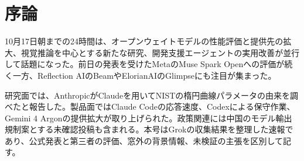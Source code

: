 \section*{序論}
10月17日朝までの24時間は、オープンウェイトモデルの性能評価と提供先の拡大、視覚推論を中心とする新たな研究、開発支援エージェントの実用改善が並行して話題になった。前日の発表を受けたMetaのMuse Spark Openへの評価が続く一方、Reflection AIのBeamやElorianAIのGlimpseにも注目が集まった。

研究面では、AnthropicがClaudeを用いてNISTの楕円曲線パラメータの由来を調べたと報告した。製品面ではClaude Codeの応答速度、Codexによる保守作業、Gemini 4 Argonの提供拡大が取り上げられた。政策関連には中国のモデル輸出規制案とする未確認投稿も含まれる。本号はGrokの収集結果を整理した速報であり、公式発表と第三者の評価、窓外の背景情報、未検証の主張を区別して記す。
